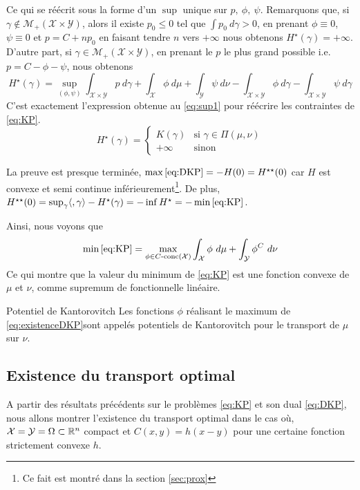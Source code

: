 \documentclass[a4paper,12pt]{article}
\begin{document}
\begin{preuve}
$$$$
Ce qui se réécrit sous la forme d'un $\sup$ unique sur $p,\ \phi,\ \psi$. Remarquons que, si $\gamma\notin\mathcal{M}_+(\mathcal{X}\times\mathcal{Y})$, alors il existe $p_0\leq 0$ tel que $\int p_0\ d\gamma >0$, en prenant $\phi\equiv 0$, $\psi\equiv 0$ et $p=C+np_0$ en faisant tendre $n$ vers $+\infty$ nous obtenons $H^{\star}(\gamma)=+\infty$. D'autre part, si $\gamma\in\mathcal{M}_+(\mathcal{X}\times\mathcal{Y})$, en prenant le $p$ le plus grand possible i.e. $p=C-\phi-\psi$, nous obtenons 
$$
H^{\star}(\gamma)=  \sup_{(\phi,\psi)} \int_{\mathcal{X}\times\mathcal{Y}} p\ d\gamma + \int_{\mathcal{X}}\phi\ d\mu + \int_{\mathcal{Y}}\psi\ d\nu - \int_{\mathcal{X}\times\mathcal{Y}} \phi\ d\gamma -\int_{\mathcal{X}\times\mathcal{Y}} \psi\ d\gamma
$$
C'est exactement l'expression obtenue au \eqref{eq:sup1} pour réécrire les contraintes de \eqref{eq:KP}. 
$$
H^{\star}(\gamma)=\left\{
\begin{array}{cl}
K(\gamma) & \text{si } \gamma \in\Pi(\mu,\nu)\\
+\infty & \text{sinon}
\end{array}
\right.
$$

La preuve est presque terminée, $\max\eqref{eq:DKP} = -H(0) = H^{\star\star}(0)$ car $H$ est convexe et semi continue inférieurement\footnote{Ce fait est montré dans la section \ref{sec:prox}}. De plus, $H^{\star\star}(0)=\sup_{\gamma}\langle 
,\gamma\rangle-H^{\star}(\gamma)=-\inf H^{\star}=-\min\eqref{eq:KP}$.
\end{preuve}

Ainsi, nous voyons que 
$$
\min\eqref{eq:KP}= \max_{\phi\in C\text{-conc}(\mathcal{X})}\int_{\mathcal{X}}\phi\ d\mu +\int_{\mathcal{Y}} \phi^C\ d\nu
$$
Ce qui montre que la valeur du minimum de \eqref{eq:KP} est une fonction convexe de $\mu$ et $\nu$, comme supremum de fonctionnelle linéaire. 
\begin{definition}{Potentiel de Kantorovitch}
Les fonctions $\phi$ réalisant le maximum de \eqref{eq:existenceDKP}sont appelés potentiels de Kantorovitch pour le transport de $\mu$ sur $\nu$.
\end{definition}

\subsection{Existence du transport optimal}

A partir des résultats précédents sur le problèmes \eqref{eq:KP} et son dual \eqref{eq:DKP}, nous allons montrer l'existence du transport optimal dans le cas où, $\mathcal{X}=\mathcal{Y}=\Omega\subset\mathbb{R}^n$ compact et $C(x,y)=h(x-y)$ pour une certaine fonction strictement convexe $h$. 
\end{document}
